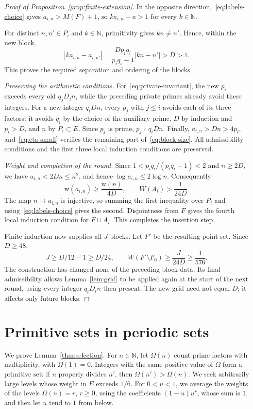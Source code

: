 \documentclass[11pt,reqno]{amsart}
\theoremstyle{definition}
\theoremstyle{remark}
\numberwithin{equation}{section}
\newcommand{\N}{\mathbb N}
\newcommand{\Om}{\Omega}
\newcommand{\wt}{\mathrm w}
\begin{document}
\begin{proof}[Proof of Proposition~\ref{prop:finite-extension}]
In the opposite direction,~\eqref{eq:labels-choice} gives
$a_{i,n}>M(F)+1$, so $ka_{i,n}-a>1$ for every $k\in\N$.

For distinct $n,n'\in P_i$ and $k\in\N$, primitivity gives
$kn\ne n'$. Hence, within the new block,
\[
 |ka_{i,n}-a_{i,n'}|
 =\frac{Dp_iq_i}{p_iq_i-1}|kn-n'|>D>1.
\]
This proves the required separation and ordering of the blocks.

\smallskip
\noindent\emph{Preserving the arithmetic conditions.}
For~\eqref{eq:private-invariant}, the new $p_i$ exceeds every old
$q_jD_jn$, while the preceding private primes already avoid these
integers. For a new integer $q_iDn$, every $p_j$ with $j\leq i$
avoids each of its three factors: it avoids $q_i$ by the choice of the
auxiliary prime, $D$ by induction and $p_i>D$, and $n$ by
$P_i\subset E$. Since $p_j$ is prime, $p_j\nmid q_iDn$.
Finally, $a_{i,n}>Dn>4p_i$, and~\eqref{eq:eta-small} verifies the
remaining part of~\eqref{eq:block-size}. All admissibility conditions
and the first three local induction conditions are preserved.

\smallskip
\noindent\emph{Weight and completion of the round.}
Since $1<p_iq_i/(p_iq_i-1)<2$ and $n\geq2D$, we have
$a_{i,n}<2Dn\leq n^2$, and hence $\log a_{i,n}\leq2\log n$.
Consequently
\[
 \wt(a_{i,n})\geq\frac{\wt(n)}{4D},\qquad
 W(A_i)>\frac1{24D}.
\]
The map $n\mapsto a_{i,n}$ is injective, so summing the first inequality
over $P_i$ and using~\eqref{eq:labels-choice} gives the second.
Disjointness from $F$ gives the fourth local induction condition for
$F\cup A_i$. This completes the insertion step.

Finite induction now supplies all $J$ blocks. Let $F'$ be the resulting
point set. Since $D\geq48$,
\[
 J\geq D/12-1\geq D/24,
 \qquad W(F'\setminus F_0)\geq\frac{J}{24D}\geq\frac1{576}.
\]
The construction has changed none of the preceding block data. Its
final admissibility allows Lemma~\ref{lem:grid} to be applied again
at the start of the next round, using every integer $q_iD_i n$ then
present. The new grid need not equal $D$; it affects only future blocks.
\end{proof}

\section{Primitive sets in periodic sets}
\label{sec:analytic}
We prove Lemma~\ref{thm:selection}. For $n\in\N$, let $\Om(n)$ count
prime factors with multiplicity, with $\Om(1)=0$. Integers with the same
positive value of $\Om$ form a primitive set: if $n$ properly divides
$n'$, then $\Om(n')>\Om(n)$. We seek arbitrarily large levels whose
weight in $E$ exceeds $1/6$. For $0<u<1$, we average the weights of the levels
$\Om(n)=r$, $r\geq0$, using the coefficients $(1-u)u^r$, whose sum is $1$,
and then let $u$ tend to $1$ from below.
\end{document}
